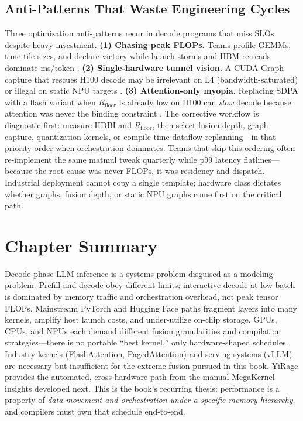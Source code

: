 \subsection{Anti-Patterns That Waste Engineering Cycles}
\label{sec:anti_patterns}

Three optimization anti-patterns recur in decode programs that miss SLOs despite heavy investment.
\textbf{(1) Chasing peak FLOPs.} Teams profile GEMMs, tune tile sizes, and declare victory while launch storms and HBM re-reads dominate ms/token \citep{taxbreak2026}.
\textbf{(2) Single-hardware tunnel vision.} A CUDA Graph capture that rescues H100 decode may be irrelevant on L4 (bandwidth-saturated) or illegal on static NPU targets \citep{memoryfloor2026,amd2024xdna}.
\textbf{(3) Attention-only myopia.} Replacing SDPA with a flash variant when $R_{\mathrm{floor}}$ is already low on H100 can \emph{slow} decode because attention was never the binding constraint \citep{memoryfloor2026}.
The corrective workflow is diagnostic-first: measure HDBI and $R_{\mathrm{floor}}$, then select fusion depth, graph capture, quantization kernels, or compile-time dataflow replanning---in that priority order when orchestration dominates.
Teams that skip this ordering often re-implement the same matmul tweak quarterly while p99 latency flatlines---because the root cause was never FLOPs, it was residency and dispatch.
Industrial deployment cannot copy a single template; hardware class dictates whether graphs, fusion depth, or static NPU graphs come first on the critical path.

\section{Chapter Summary}
\label{sec:ch01_summary}

Decode-phase LLM inference is a systems problem disguised as a modeling problem.
Prefill and decode obey different limits; interactive decode at low batch is dominated by memory traffic and orchestration overhead, not peak tensor FLOPs.
Mainstream PyTorch and Hugging Face paths fragment layers into many kernels, amplify host launch costs, and under-utilize on-chip storage.
GPUs, CPUs, and NPUs each demand different fusion granularities and compilation strategies---there is no portable ``best kernel,'' only hardware-shaped schedules.
Industry kernels (FlashAttention, PagedAttention) and serving systems (vLLM) are necessary but insufficient for the extreme fusion pursued in this book.
YiRage provides the automated, cross-hardware path from the manual MegaKernel insights developed next.
This is the book's recurring thesis: performance is a property of \emph{data movement and orchestration under a specific memory hierarchy}, and compilers must own that schedule end-to-end.

